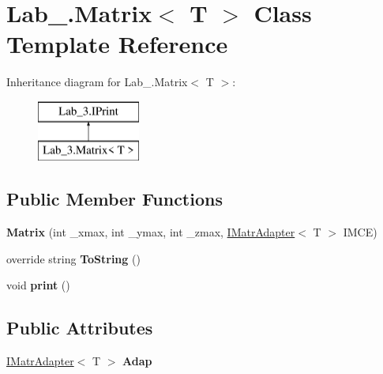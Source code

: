 \hypertarget{class_lab__3_1_1_matrix}{}\section{Lab\+\_.\+Matrix$<$ T $>$ Class Template Reference}
\label{class_lab__3_1_1_matrix}
Inheritance diagram for Lab\+\_.\+Matrix$<$ T $>$\+:\begin{figure}[H]
\begin{center}
\leavevmode
\includegraphics[height=2.000000cm]{class_lab__3_1_1_matrix}
\end{center}
\end{figure}
\subsection*{Public Member Functions}
\begin{DoxyCompactItemize}
\item 
\mbox{\label{class_lab__3_1_1_matrix_ad27089ac3ced6a9be1b1a539c4bf648c}} 
{\bfseries Matrix} (int \+\_\+xmax, int \+\_\+ymax, int \+\_\+zmax, \hyperlink{interface_lab__3_1_1_i_matr_adapter}{I\+Matr\+Adapter}$<$ T $>$ I\+M\+CE)
\item 
\mbox{\label{class_lab__3_1_1_matrix_a57479fbdcf5cec14ba87e4262a31f2a4}} 
override string {\bfseries To\+String} ()
\item 
\mbox{\label{class_lab__3_1_1_matrix_a95b3ff17ea377e285ac5a994f8d417a5}} 
void {\bfseries print} ()
\end{DoxyCompactItemize}
\subsection*{Public Attributes}
\begin{DoxyCompactItemize}
\item 
\mbox{\label{class_lab__3_1_1_matrix_a802a5a8fb9928f8e1a77c57890c5dd76}} 
\hyperlink{interface_lab__3_1_1_i_matr_adapter}{I\+Matr\+Adapter}$<$ T $>$ {\bfseries Adap}
\end{DoxyCompactItemize}
